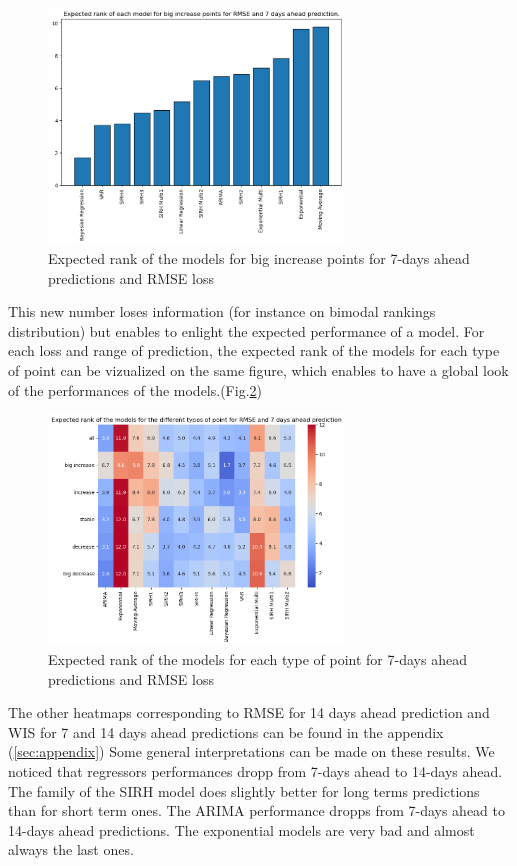 \begin{figure}[h]
    \centering
    \includegraphics[width=0.7\textwidth]{figures/expected_ranks_big_increase_RMSE_7.png}
    \caption{Expected rank of the models for big increase points for 7-days ahead predictions and RMSE loss}
    \label{fig:expected_rank}
\end{figure}
This new number loses information (for instance on bimodal rankings distribution) but enables to enlight the expected performance of a model. 
For each loss and range of prediction, the expected rank of the models for each type of point can be vizualized on the same figure, which enables to have a global look of the performances of the models.(Fig.\ref{fig:heatmap_RMSE_7}) 
\begin{figure}[h]
    \centering
    \includegraphics[width=0.7\textwidth]{figures/heatmap_RMSE_7.png}
    \caption{Expected rank of the models for each type of point for 7-days ahead predictions and RMSE loss}
    \label{fig:heatmap_RMSE_7}
\end{figure}


The other heatmaps corresponding to RMSE for 14 days ahead prediction and WIS for 7 and 14 days ahead predictions can be found in the appendix (\ref{sec:appendix})
Some general interpretations can be made on these results. 
We noticed that regressors performances dropp from 7-days ahead to 14-days ahead. 
The family of the SIRH model does slightly better for long terms predictions than for short term ones. 
The ARIMA performance dropps from 7-days ahead to 14-days ahead predictions. 
The exponential models are very bad and almost always the last ones. 

